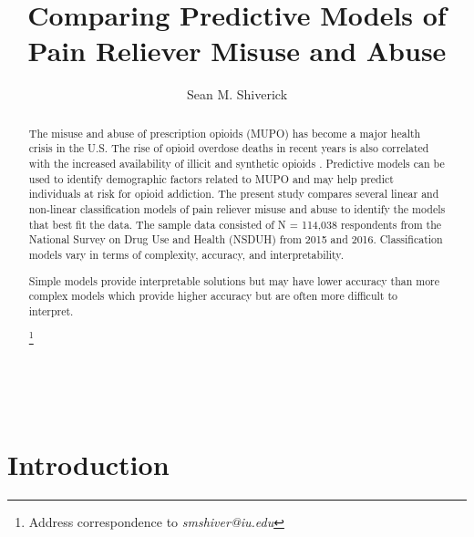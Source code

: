 \\\documentclass[sigconf]{acmart}
\begin{document}
  \title{Comparing Predictive Models of Pain Reliever Misuse and Abuse}
  \author{Sean M. Shiverick}
\renewcommand{\shortauthors}{S.M. Shiverick}


\begin{abstract}

The misuse and abuse of prescription opioids (MUPO) has become a major health 
crisis in the U.S. The rise of opioid overdose deaths in recent years is also 
correlated with the increased availability of illicit and synthetic opioids
\cite{nida18}. Predictive models can be used to identify demographic factors 
related to MUPO and may help predict individuals at risk for opioid addiction.
The present study compares several linear and non-linear classification models 
of pain reliever misuse and abuse to identify the models that best fit the data. 
The sample data consisted of N = 114,038 respondents from the National Survey 
on Drug Use and Health (NSDUH) from 2015 and 2016. Classification models 
vary in terms of complexity, accuracy, and interpretability. 

Simple models provide interpretable solutions but may have lower accuracy 
than more complex models which provide higher accuracy but are often more 
difficult to interpret.   

\footnote{ Address correspondence to \textit{smshiver@iu.edu}}
\end{abstract}
\maketitle

\section{Introduction}
\end{document}
